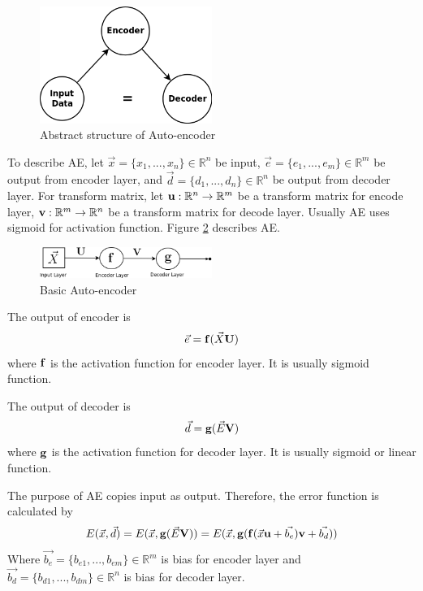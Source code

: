 \documentclass[draft,dvipsnames]{drexel-thesis}
\begin{document}
\begin{thesis}
\begin{figure}[t!]
    \centering
    \includegraphics[width=0.5\textwidth]{pictures/figures/AE.png}
    \caption{Abstract structure of Auto-encoder}
    \label{fig:AE}
\end{figure}

To describe AE, let $\vec{x} = \{x_1, ..., x_n\} \in \mathbb{R}^n$ be input, $\vec{e} = \{e_1, ..., e_m\} \in \mathbb{R}^m$ be output from encoder layer, and $\vec{d} = \{d_1, ..., d_n\} \in \mathbb{R}^n$ be output from decoder layer. For transform matrix, let $\bold{u}: \mathbb{R}^n \rightarrow \mathbb{R}^m$ be a transform matrix for encode layer, $\bold{v}: \mathbb{R}^m \rightarrow \mathbb{R}^n$ be a transform matrix for decode layer. Usually AE uses sigmoid for activation function. Figure \ref{fig:basic_AE} describes AE.

\begin{figure}[t!]
    \centering
    \includegraphics[width=0.5\textwidth]{pictures/figures/basic_AE.png}
    \caption{Basic Auto-encoder}
    \label{fig:basic_AE}
\end{figure}

The output of encoder is
$$\vec{e} = \bold{f}(\vec{X}\bold{U})$$
where $\bold{f}$ is the activation function for encoder layer. It is usually sigmoid function.

The output of decoder is
$$\vec{d} = \bold{g}(\vec{E}\bold{V})$$
where $\bold{g}$ is the activation function for decoder layer. It is usually sigmoid or linear function.

The purpose of AE copies input as output. Therefore, the error function is calculated by
$$E(\vec{x}, \vec{d}) = E(\vec{x}, \bold{g}(\vec{E}\bold{V})) = E(\vec{x}, \bold{g}(\bold{f}(\vec{x}\bold{u}+\vec{b_e})\bold{v}+\vec{b_d}))$$
Where $\vec{b_e} = \{b_{e1}, ..., b_{em}\} \in \mathbb{R}^m$ is bias for encoder layer and $\vec{b_d} = \{b_{d1}, ..., b_{dm}\} \in \mathbb{R}^n$ is bias for decoder layer.


\end{thesis}
\end{document}
